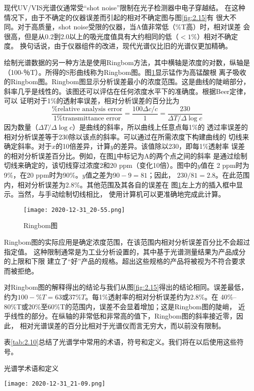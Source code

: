 现代UV/VIS光谱仪通常受“shot noise”限制在光子检测器中电子穿越结。
在这种情况下，由于不确定的仪器误差而引起的相对不确定图与图\ref{fig:2.15}有
很大不同。对于高质量，shot noise受限的仪器，当A值非常低（\%T高）时，相对误差
会很高，但是从0.2到2.0以上的吸光度值具有大约相同的低（$<1\%$）相对不确定度。
换句话说，由于仪器组件的改进，现代光谱仪比旧的光谱仪更加精确。

绘制光谱数据的另一种方法是使用Ringbom方法，其中横轴是浓度的对数，纵轴是
（100-％T）。所得的S形曲线称为Ringbom图。图\ref{fig:2.16}显示锰作为高锰酸根
离子吸收的Ringbom图。Ringbom图显示分析误差最小的浓度范围。这是曲线的陡峭部分，
斜率几乎是线性的。该图还可以评估在任何浓度水平下的准确度。根据Beer定律，可以
证明对于1\%的透射率误差，相对分析误差的百分比为
\begin{equation}
    \frac{\text{\% relative analysis error}}{\text{1\% transmittance error}} =
    \frac{100 \Delta c/c}{1} = \frac{230}{\Delta T/\Delta \log c}
    \label{2.16}
\end{equation}
因为数量（$\Delta T/\Delta \log c$）是曲线的斜率，所以曲线上任意点每1\%的
透过率误差的相对分析误差等于230除以该点的斜率。可以通过在所需浓度下构建曲线的
切线来确定斜率。对于$x$的10倍差异，计算$y$的差异。该值除以230，即每1\%透射率
误差的相对分析误差百分比。例如，在图\ref{fig:2.16}中标记为A的两个点之间的斜率
是通过绘制切线来确定的，该切线穿过浓度2和20 ppm（变化10倍）。图中的$y$值在
2 ppm时为9\%，在20 ppm时为90\%。$y$值之差为$90 − 9 = 81$；因此，
$230/81 = 2.8$。在此范围内，相对分析误差为2.8\%。其他范围及其各自的误差在
图\ref{fig:2.16}左上方的插入框中显示。当然，与手动绘制切线相比，
使用计算机可以更准确地完成此计算。
\begin{figure}[htpb]
    \centering
    \texttt{[image: 2020-12-31\_20-55.png]}
    \caption{Ringbom图}
    \label{fig:2.16}
\end{figure}

Ringbom图的实际应用是确定浓度范围，在该范围内相对分析误差百分比不会超过指定值。
这种限制通常是为工业分析设置的，其中基于光谱测量结果为产品成分的上限和下限
建立了“好”产品的规格。超出这些规格的产品将被视为不符合要求而被拒绝。

对Ringbom图的解释得出的结论与我们从图\ref{fig:2.15}得出的结论相同。误差最低，
约为$100 - \% T = 63$或$37\% T$。每1\%透射率的相对分析误差约为2.8\%。在
40\%--80\%T或20\%至60\%T的范围内，误差不会显着增加；这是Ringbom图的陡峭，
近乎线性的部分。在纵轴的非常低和非常高的值下，Ringbom图的斜率接近零，因此，
相对光谱误差的百分比相对于光谱仪而言无穷大，而以前没有限制。

表\ref{tab:2.10}总结了光谱学中常用的术语，符号和定义。我们将在以后使用这些符号。
\begin{table}[htbp]
    \centering
    \caption{光谱学术语和定义}
    \label{tab:2.10}
    \texttt{[image: 2020-12-31\_21-09.png]}
\end{table}
